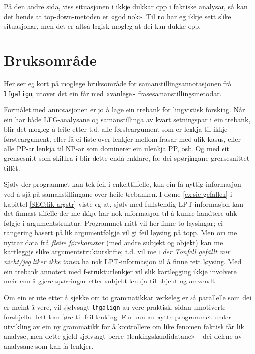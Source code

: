 \documentclass[12pt,a4paper,oneside,draft]{report}
\begin{document}
På den andre sida, viss situasjonen i \Last ikkje dukkar opp i
 faktiske analysar, så kan det hende at top-down-metoden er «god
 nok». Til no har eg ikkje sett slike situasjonar, men det er altså
 logisk mogleg at dei kan dukke opp.

\section{Bruksområde}
\label{sec-5.5}


Her ser eg kort på moglege bruksområde for samanstillingsannotasjonen
 frå \texttt{lfgalign}, utover det ein får med «vanlege»
 frasesamanstillingsmetodar.

Formålet med annotasjonen er jo å lage ein trebank for lingvistisk
 forsking. Når ein har både LFG-analysane og samanstillinga av kvart
 setningspar i ein trebank, blir det mogleg å leite etter t.d. alle
 førsteargument som er lenkja til ikkje-førsteargument, eller få ei
 liste over lenkjer mellom frasar med ulik kasus, eller alle PP-ar
 lenkja til NP-ar som dominerer ein ulenkja PP, osb. Og med eit
 grensesnitt som skildra i \citet{dyvik2009lmp} blir dette endå
 enklare, for dei spørjingane grensesnittet tillèt.
 
Sjølv der programmet kan tek feil i enkelttilfelle, kan ein få nyttig
 informasjon ved å sjå på samanstillingane over heile trebanken.  I
 døme \ref{ex:sie-gefallen} i kapittel \ref{SEC:lik-argstr} viste eg
 at, sjølv med fullstendig LPT\hyp{}informasjon kan det finnast tilfelle
 der me ikkje har nok informasjon til å kunne handtere ulik følgje i
 argumentstruktur. Programmet mitt vil her finne to løysingar; ei
 rangering basert på lik argumentfølgje vil gi feil løysing på topp.
 Men om me nyttar data frå \emph{fleire førekomstar} (med andre subjekt og
 objekt) kan me kartleggje slike argumentstrukturskifte; t.d. vil me i
 \emph{der Tonfall gefällt mir nicht/jeg liker ikke tonen} ha nok
 LPT\hyp{}informasjon til å finne rett løysing. Med ein trebank annotert
 med f\hyp{}strukturlenkjer vil slik kartlegging ikkje involvere meir enn å
 gjere spørringar etter subjekt lenkja til objekt og omvendt.

Om ein er ute etter å sjekke om to grammatikkar verkeleg er så
 parallelle som dei er meint å vere, vil sjølvsagt \texttt{lfgalign} au vere
 praktisk, sidan umotiverte forskjellar lett kan føre til feil
 lenking. Ein kan au nytte programmet under utvikling av ein ny
 grammatikk for å kontrollere om like fenomen faktisk får lik analyse,
 men dette gjeld sjølvsagt berre «lenkingskandidatane» -- dei delene
 av analysane som kan få lenkjer.
\end{document}
